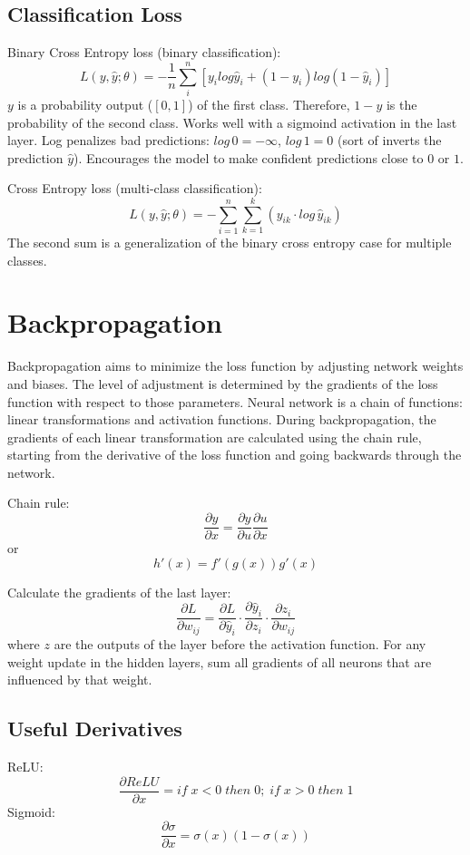 \documentclass{scrartcl}
\begin{document}
\subsection*{Classification Loss}
Binary Cross Entropy loss (binary classification):
$$L(y, \hat{y}; \theta) = - \frac{1}{n} \sum_{i}^{n} [y_i log \hat{y}_i + (1 - y_i) log(1 - \hat{y}_i)] $$
$y$ is a probability output ($[0,1]$) of the first class. Therefore, $1 - y$ is the probability of the second class. Works well with a sigmoind activation in the last layer.
Log penalizes bad predictions: $log \, 0 = - \infty$, $log \, 1 = 0$ (sort of inverts the prediction $\hat{y}$).
Encourages the model to make confident predictions close to $0$ or $1$.

Cross Entropy loss (multi-class classification):
$$L(y, \hat{y}; \theta) = - \sum_{i=1}^{n} \sum_{k=1}^{k} (y_{ik} \cdot log \, \hat{y}_{ik})$$
The second sum is a generalization of the binary cross entropy case for multiple classes.


\section*{Backpropagation}
Backpropagation aims to minimize the loss function by adjusting network weights and biases. The level of adjustment is determined by the gradients of the loss function with respect to those parameters.
Neural network is a chain of functions: linear transformations and activation functions. During backpropagation, the gradients of each linear transformation are calculated using the chain rule, starting from the derivative of the loss function and going backwards through the network.

Chain rule:
$$\frac{\partial y}{\partial x}=\frac{\partial y}{\partial u} \frac{\partial u}{\partial x}$$
or
$$h'(x) = f'(g(x))g'(x)$$

Calculate the gradients of the last layer:
$$\frac{\partial L}{\partial w_{ij}} = \frac{\partial L}{\partial \hat{y}_i} \cdot \frac{\partial \hat{y}_i}{\partial z_i} \cdot \frac{\partial z_i}{\partial w_{ij}}$$
where $z$ are the outputs of the layer before the activation function.
For any weight update in the hidden layers, sum all gradients of all neurons that are influenced by that weight.

\subsection*{Useful Derivatives}
ReLU:
$$\frac{\partial ReLU}{\partial x} = if \; x < 0 \; then \; 0; \; if \; x > 0 \; then \; 1$$
Sigmoid:
$$\frac{\partial \sigma}{\partial x} = \sigma (x) (1 - \sigma (x))$$
\end{document}
